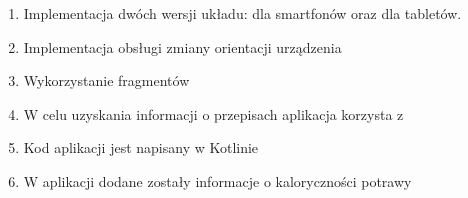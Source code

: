 \documentclass{article}
\begin{document}
\begin{enumerate}
\begin{enumerate}
              \item Implementacja dwóch wersji układu: dla smartfonów oraz dla tabletów.
              \item Implementacja obsługi zmiany orientacji urządzenia
              \item Wykorzystanie fragmentów
              \item W celu uzyskania informacji o przepisach aplikacja korzysta z 
              \item Kod aplikacji jest napisany w Kotlinie
              \item W aplikacji dodane zostały informacje o kaloryczności potrawy
          \end{enumerate}
\end{enumerate}
\end{document}
